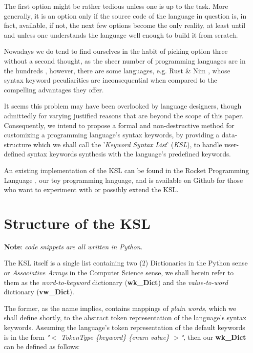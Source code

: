 \documentclass[a4paper,9pt]{article}
\begin{document}
\begin{multicols}{2}
The first option might be rather tedious unless one is up to the task. More generally, it is an option only if the source code of the language in question is, in fact, available, if not, the next few options become the only reality, at least until and unless one understands the language well enough to build it from scratch.

Nowadays we do tend to find ourselves in the habit of picking option three without a second thought, as the sheer number of programming languages are in the hundreds \cite{Langlst}, however, there are some languages, e.g. Rust \cite{Rust} \& Nim \cite{Nim}, whose syntax keyword peculiarities are inconsequential when compared to the compelling advantages they offer.

It seems this problem may have been overlooked by language designers, though admittedly for varying justified reasons that are beyond the scope of this paper. Consequently, we intend to propose a formal and non-destructive method for customizing a programming language's syntax keywords, by providing a data-structure which we shall call the '\textit{Keyword Syntax List}' (\textit{KSL}), to handle user-defined syntax keywords synthesis with the language's predefined keywords.

An existing implementation of the KSL can be found in the Rocket Programming Language \cite{Rocket}, our toy programming language, and is available on Github \cite{Rocket} for those who want to experiment with or possibly extend the KSL.

\end{multicols}


\section{Structure of the KSL}

\textbf{Note}: \textit{code snippets are all written in Python}.
\newline

The KSL itself is a single list containing two (2) Dictionaries in the Python sense or \textit{Associative Arrays} in the Computer Science sense, we shall herein refer to them as the \textit{word-to-keyword} dictionary (\textbf{wk\_Dict}) and the \textit{value-to-word} dictionary (\textbf{vw\_Dict}). 

The former, as the name implies, contains mappings of \textit{plain words}, which we shall define shortly, to the abstract token representation of the language's syntax keywords. Assuming the language's token representation of the default keywords is in the form \textit{"$<$ TokenType \{keyword\} \{enum value\} $>$"}, then our \textbf{wk\_Dict} can be defined as follows:
\end{document}

